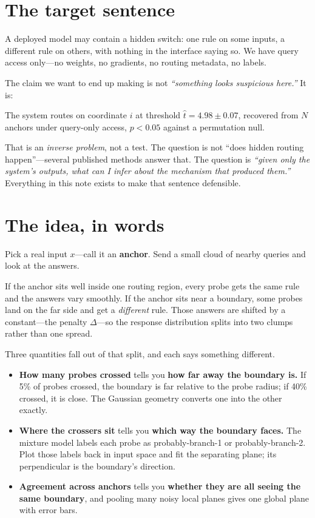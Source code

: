 \documentclass[11pt]{article}
\newcommand{\that}{\hat{t}}
\begin{document}
\section{The target sentence}
\label{sec:target}

A deployed model may contain a hidden switch: one rule on some inputs, a different rule on
others, with nothing in the interface saying so. We have query access only---no weights, no
gradients, no routing metadata, no labels.

The claim we want to end up making is not \emph{``something looks suspicious here.''} It is:

\begin{claimbox}
\noindent The system routes on coordinate $i$ at threshold $\that = 4.98 \pm 0.07$, recovered
from $N$ anchors under query-only access, $p < 0.05$ against a permutation null.
\end{claimbox}

\noindent That is an \emph{inverse problem}, not a test. The question is not ``does hidden
routing happen''---several published methods answer that. The question is \emph{``given only the
system's outputs, what can I infer about the mechanism that produced them.''} Everything in this
note exists to make that sentence defensible.

\section{The idea, in words}
\label{sec:idea}

Pick a real input $x$---call it an \textbf{anchor}. Send a small cloud of nearby queries and look
at the answers.

If the anchor sits well inside one routing region, every probe gets the same rule and the answers
vary smoothly. If the anchor sits near a boundary, some probes land on the far side and get a
\emph{different} rule. Those answers are shifted by a constant---the penalty $\Delta$---so the
response distribution splits into two clumps rather than one spread.

Three quantities fall out of that split, and each says something different.

\begin{itemize}
\item \textbf{How many probes crossed} tells you \textbf{how far away the boundary is.} If 5\% of
probes crossed, the boundary is far relative to the probe radius; if 40\% crossed, it is close.
The Gaussian geometry converts one into the other exactly.
\item \textbf{Where the crossers sit} tells you \textbf{which way the boundary faces.} The mixture
model labels each probe as probably-branch-1 or probably-branch-2. Plot those labels back in input
space and fit the separating plane; its perpendicular is the boundary's direction.
\item \textbf{Agreement across anchors} tells you \textbf{whether they are all seeing the same
boundary}, and pooling many noisy local planes gives one global plane with error bars.
\end{itemize}
\end{document}
